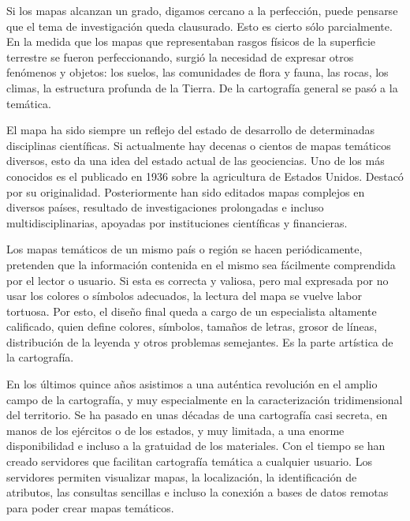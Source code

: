 Si los mapas alcanzan un grado, digamos cercano a la perfecci\'on, puede pensarse que el tema de investigaci\'on queda clausurado. Esto es cierto s\'olo parcialmente. En la medida que los mapas que representaban rasgos f\'isicos de la superficie terrestre se fueron perfeccionando, surgi\'o la necesidad de expresar otros fen\'omenos y objetos: los suelos, las comunidades de flora y fauna, las rocas, los climas, la estructura profunda de la Tierra. De la cartograf\'ia general se pas\'o a la tem\'atica.

El mapa ha sido siempre un reflejo del estado de desarrollo de determinadas disciplinas cient\'ificas. Si actualmente hay decenas o cientos de mapas tem\'aticos diversos, esto da una idea del estado actual de las geociencias. Uno de los m\'as conocidos es el publicado en 1936 sobre la agricultura de Estados Unidos. Destac\'o por su originalidad. Posteriormente han sido editados mapas complejos en diversos pa\'ises, resultado de investigaciones prolongadas e incluso multidisciplinarias, apoyadas por instituciones cient\'ificas y financieras.

Los mapas tem\'aticos de un mismo pa\'is o regi\'on se hacen peri\'odicamente, pretenden que la informaci\'on contenida en el mismo sea f\'acilmente comprendida por el lector o usuario. Si esta es correcta y valiosa, pero mal expresada por no usar los colores o s\'imbolos adecuados, la lectura del mapa se vuelve labor tortuosa. Por esto, el dise\~no final queda a cargo de un especialista altamente calificado, quien define colores, s\'imbolos, tama\~nos de letras, grosor de l\'ineas, distribuci\'on de la leyenda y otros problemas semejantes. Es la parte art\'istica de la cartograf\'ia.

En los \'ultimos quince a\~nos asistimos a una aut\'entica revoluci\'on en el amplio campo de la cartograf\'ia, y muy especialmente en la caracterizaci\'on tridimensional del territorio. Se ha pasado en unas d\'ecadas de una cartograf\'ia casi secreta, en manos de los ej\'ercitos o de los estados, y muy limitada, a una enorme disponibilidad e incluso a la gratuidad de los materiales. Con el tiempo se han creado servidores que facilitan cartograf\'ia tem\'atica a cualquier usuario. Los servidores permiten visualizar mapas, la localizaci\'on, la identificaci\'on de atributos, las consultas sencillas e incluso la conexi\'on a bases de datos remotas para poder crear mapas tem\'aticos.



